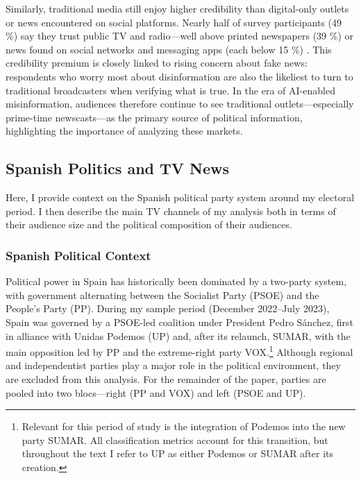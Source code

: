 \documentclass[12pt]{article}
\begin{document}
	
	

	
	
Similarly, traditional media still enjoy higher credibility than digital-only outlets or news encountered on social platforms. Nearly half  of survey participants (49 \%) say they trust public TV and radio—well above printed newspapers (39 \%) or news found on social networks and messaging apps (each below 15 \%) \citep{eurobarometer2022}. This credibility premium is closely linked to rising concern about fake news: respondents who worry most about disinformation are also the likeliest to turn to traditional broadcasters when verifying what is true. In the era of AI-enabled misinformation, audiences therefore continue to see traditional outlets—especially prime-time newscasts—as the primary source of political information, highlighting the importance of analyzing these markets. 
	
	
	
	
	
	
	\subsection{Spanish Politics and TV News}
	
	
	
Here, I provide context on the Spanish political party system around my electoral period. I then describe the main TV channels of my analysis both in terms of their audience size and  the political composition of their audiences. 

	
	
	
	\subsubsection*{Spanish Political Context}
	

	

	
	
	Political power in Spain has historically been dominated by a two-party system, with government alternating between the Socialist Party (PSOE) and the People’s Party (PP). During my sample period (December 2022–July 2023), Spain was governed by a PSOE-led coalition under President Pedro Sánchez, first in alliance with Unidas Podemos (UP) and, after its relaunch, SUMAR,  with the main opposition led by PP and the extreme-right party VOX.\footnote{Relevant for this period of study is the integration of Podemos into the new party SUMAR. All classification metrics account for this transition, but throughout the text I refer to UP as either Podemos or SUMAR after its creation.} Although regional and independentist parties play a major role in the political environment, they are excluded from this analysis. For the remainder of the paper, parties are pooled into two blocs—right (PP and VOX) and left (PSOE and UP).
	
\end{document}
